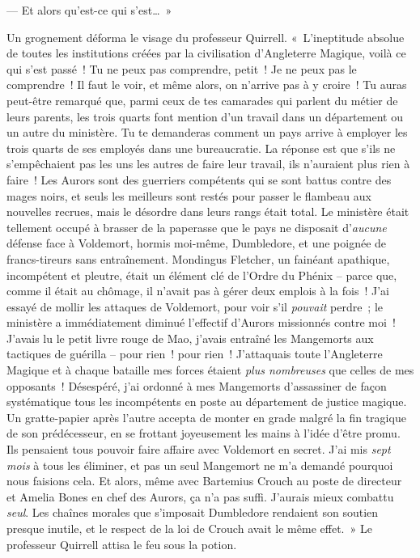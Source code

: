 --- Et alors qu'est-ce qui s'est…~»

Un grognement déforma le visage du professeur Quirrell. «~L'ineptitude absolue de toutes les institutions créées par la civilisation d'Angleterre Magique, voilà ce qui s'est passé~! Tu ne peux pas comprendre, petit~! Je ne peux pas le comprendre~! Il faut le voir, et même alors, on n'arrive pas à y croire~! Tu auras peut-être remarqué que, parmi ceux de tes camarades qui parlent du métier de leurs parents, les trois quarts font mention d'un travail dans un département ou un autre du ministère. Tu te demanderas comment un pays arrive à employer les trois quarts de ses employés dans une bureaucratie. La réponse est que s'ils ne s'empêchaient pas les uns les autres de faire leur travail, ils n'auraient plus rien à faire~! Les Aurors sont des guerriers compétents qui se sont battus contre des mages noirs, et seuls les meilleurs sont restés pour passer le flambeau aux nouvelles recrues, mais le désordre dans leurs rangs était total. Le ministère était tellement occupé à brasser de la paperasse que le pays ne disposait d'\emph{aucune} défense face à Voldemort, hormis moi-même, Dumbledore, et une poignée de francs-tireurs sans entraînement. Mondingus Fletcher, un fainéant apathique, incompétent et pleutre, était un élément clé de l'Ordre du Phénix -- parce que, comme il était au chômage, il n'avait pas à gérer deux emplois à la fois~! J'ai essayé de mollir les attaques de Voldemort, pour voir s'il \emph{pouvait} perdre~; le ministère a immédiatement diminué l'effectif d'Aurors missionnés contre moi~! J'avais lu le petit livre rouge de Mao, j'avais entraîné les Mangemorts aux tactiques de guérilla -- pour rien~! pour rien~! J'attaquais toute l'Angleterre Magique et à chaque bataille mes forces étaient \emph{plus nombreuses} que celles de mes opposants~! Désespéré, j'ai ordonné à mes Mangemorts d'assassiner de façon systématique tous les incompétents en poste au département de justice magique. Un gratte-papier après l'autre accepta de monter en grade malgré la fin tragique de son prédécesseur, en se frottant joyeusement les mains à l'idée d'être promu. Ils pensaient tous pouvoir faire affaire avec Voldemort en secret. J'ai mis \emph{sept mois} à tous les éliminer, et pas un seul Mangemort ne m'a demandé pourquoi nous faisions cela. Et alors, même avec Bartemius Crouch au poste de directeur et Amelia Bones en chef des Aurors, ça n'a pas suffi. J'aurais mieux combattu \emph{seul}. Les chaînes morales que s'imposait Dumbledore rendaient son soutien presque inutile, et le respect de la loi de Crouch avait le même effet.~» Le professeur Quirrell attisa le feu sous la potion.

